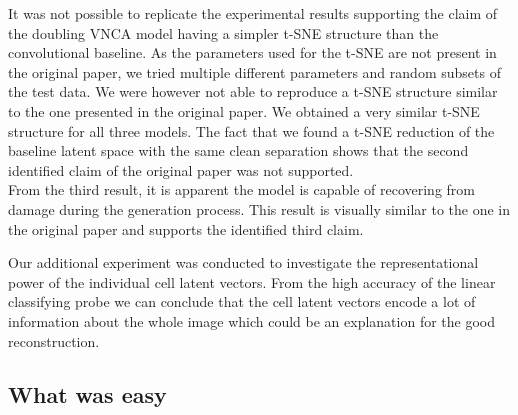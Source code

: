 It was not possible to replicate the experimental results supporting the claim of the doubling VNCA model having a simpler t-SNE structure than the convolutional baseline. As the parameters used for the t-SNE are not present in the original paper, we tried multiple different parameters and random subsets of the test data. We were however not able to reproduce a t-SNE structure similar to the one presented in the original paper. We obtained a very similar t-SNE structure for all three models. The fact that we found a t-SNE reduction of the baseline latent space with the same clean separation shows that the second identified claim of the original paper was not supported. %
\\

From the third result, it is apparent the model is capable of recovering from damage during the generation process. This result is visually similar to the one in the original paper and supports the identified third claim.  

Our additional experiment was conducted to investigate the representational power of the individual cell latent vectors. From the high accuracy of the linear classifying probe we can conclude that the cell latent vectors encode a lot of information about the whole image which could be an explanation for the good reconstruction.



\subsection{What was easy}


